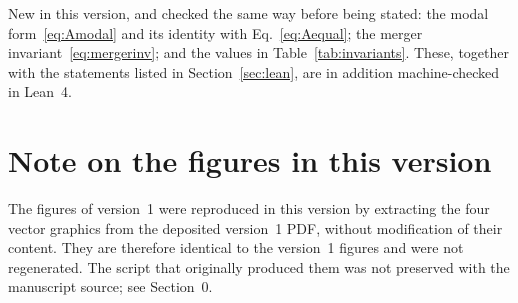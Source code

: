 \documentclass[11pt]{article}
\theoremstyle{plain}
\theoremstyle{remark}
\begin{document}
New in this version, and checked the same way before being stated: the modal
form~\eqref{eq:Amodal} and its identity with Eq.~\eqref{eq:Aequal}; the merger
invariant~\eqref{eq:mergerinv}; and the values in Table~\ref{tab:invariants}. These, together
with the statements listed in Section~\ref{sec:lean}, are in addition machine-checked in
Lean~4.

\section{Note on the figures in this version}

The figures of version~1 were reproduced in this version by extracting the four vector graphics
from the deposited version~1 PDF, without modification of their content. They are therefore
identical to the version~1 figures and were not regenerated. The script that originally
produced them was not preserved with the manuscript source; see Section~0.



\end{document}
